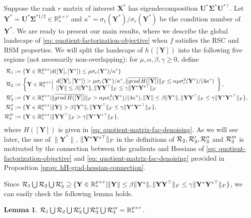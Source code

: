 \documentclass[11pt]{article}
\newtheorem{Lemma}{Lemma}
\newcommand{\bbR}{\mathbb{R}}
\newcommand{\0}{{\mathbf{0}}}
\newcommand{\1}{{\mathbf{1}}}
\newcommand{\X}{{\mathbf{X}}}
\newcommand{\U}{{\mathbf{U}}}
\newcommand{\Y}{{\mathbf{Y}}}
\newcommand{\cR}{{\cal R}}
\newcommand{\bSigma}{\boldsymbol{\Sigma}}
\newcommand{\grad}{{\rm grad}}
\newcommand{\F}{{\rm F}}
\newcommand{\nc}{\normalcolor}
\begin{document}
Suppose the rank $r$ matrix of interest $\X^*$ has eigendecomposition $\U^* \bSigma^* \U^{*\top}$. Let $\Y^* = \U^* \bSigma^{*1/2} \in \bbR^{p \times r}_*$ and $\kappa^* = \sigma_1(\Y^*)/\sigma_r(\Y^*)$ be the condition number of $\Y^*$. We are ready to present our main results, where we describe the global landscape of \eqref{eq: quotient-factorization-objective} when $f$ satisfies the RSC and RSM properties. We will split the landscape of $h([\Y])$ into the following five regions (not necessarily non-overlapping): for $\mu, \alpha, \beta, \gamma \geq 0$, define
\begin{equation} \label{def: regions}
	\begin{split}
		\cR_1 &:= \{ \Y \in \bbR^{p \times r}_*| d([\Y], [\Y^*] ) \leq \mu \sigma_r(\Y^*)/\kappa^*  \} \\
		\cR_2 &:= \left\{  \Y \in \bbR^{p \times r}_* \Big| \begin{array}{l}
			 d([\Y], [\Y^*]) > \mu \sigma_r(\Y^*)/\kappa^*, \|\overline{\grad\, H([\Y])} \|_\F \leq \alpha \mu \sigma^3_r(\Y^*)/(4\kappa^*) \\
			 \|\Y\| \leq \beta \|\Y^*\|, \|\Y \Y^\top\|_\F \leq \gamma \|\Y^* \Y^{*\top}\|_\F 
		\end{array}   \right\}, \\
		\cR'_3 & :=  \{  \Y \in \bbR^{p \times r}_* | \|\overline{\grad\, H([\Y])} \|_\F > \alpha \mu \sigma^3_r(\Y^*)/(4\kappa^*), \|\Y\| \leq \beta \|\Y^*\|, \|\Y \Y^\top\|_\F \leq \gamma \|\Y^* \Y^{*\top}\|_\F   \},\\
		\cR_3'' & := \{  \Y \in \bbR^{p \times r}_* | \|\Y\| > \beta \|\Y^*\|, \|\Y \Y^\top\|_\F \leq \gamma \|\Y^* \Y^{*\top}\|_\F \}, \\
		\cR_3''' & := \{  \Y \in \bbR^{p \times r}_* | \|\Y \Y^\top\|_\F > \gamma \|\Y^* \Y^{*\top}\|_\F \},
	\end{split}
\end{equation} where $H([\Y])$ is given in \eqref{eq: quotient-matrix-fac-denoising}.  As we will see later, the use of $\|\Y^*\|$, $\|\Y^* \Y^{*\top}\|_\F$ in the definitions of $\cR_2, \cR_3', \cR_3''$ and $\cR_3'''$ is motivated by the connection between the gradients and Hessians of \eqref{eq: quotient-factorization-objective} and \eqref{eq: quotient-matrix-fac-denoising} provided in Proposition \ref{prop: hH-grad-hessian-connection}. \nc 


Since $\cR_1 \bigcup \cR_2 \bigcup \cR_3' \supseteq \{  \Y \in \bbR^{p \times r}_* |\|\Y\| \leq \beta \|\Y^*\|, \|\Y \Y^\top\|_\F \leq \gamma \|\Y^* \Y^{*\top}\|_\F  \} $, we can easily check the following lemma holds.
 \begin{Lemma}
	$\cR_1 \bigcup \cR_2 \bigcup \cR_3' \bigcup \cR''_3 \bigcup \cR'''_3 = \bbR^{p \times r}_* $. 
\end{Lemma}
\end{document}
